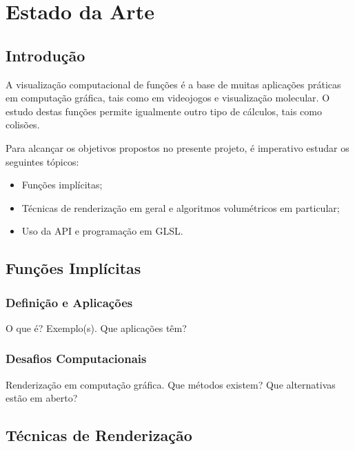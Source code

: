 \chapter{Estado da Arte}
\label{ch::arte}

\section{Introdução}
\label{sec::arte:intro}

A visualização computacional de funções é a base de muitas aplicações práticas em computação gráfica, tais como em videojogos e visualização molecular. O estudo destas funções permite igualmente outro tipo de cálculos, tais como colisões.

Para alcançar os objetivos propostos no presente projeto, é imperativo estudar os seguintes tópicos:

\begin{itemize}
	\item Funções implícitas;
	\item Técnicas de renderização em geral e algoritmos volumétricos em particular;
	\item Uso da \ac{API} \opengl e programação em \ac{GLSL}.
\end{itemize}


\section{Funções Implícitas}
\label{sec::arte:implicitas}

\subsection{Definição e Aplicações}
\label{ssec::arte:implicitas:def}

O que é? Exemplo(s). Que aplicações têm?

\subsection{Desafios Computacionais}
\label{ssec::arte:implicitas:desafios}

Renderização em computação gráfica. Que métodos existem? Que alternativas estão em aberto?


\section{Técnicas de Renderização}
\label{sec::arte:render}

